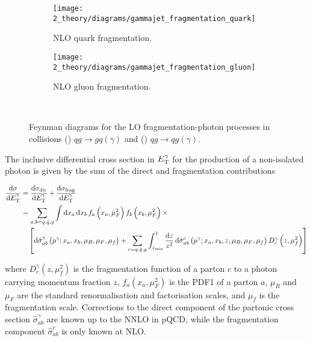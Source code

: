 \begin{figure}[ht!]
    \centering
    \begin{subfigure}[h]{0.49\linewidth}
        \centering
        \texttt{[image: 2\_theory/diagrams/gammajet\_fragmentation\_quark]}
        \caption{\ac{NLO} quark fragmentation.}
        \label{fig:theory:sm:prompt_photon:feynman_lo_frag:quark}
    \end{subfigure}
    \hfill
    \begin{subfigure}[h]{0.49\linewidth}
        \centering
        \texttt{[image: 2\_theory/diagrams/gammajet\_fragmentation\_gluon]}
        \caption{\ac{NLO} gluon fragmentation.}
        \label{fig:theory:sm:prompt_photon:feynman_lo_frag:gluon}
    \end{subfigure}\\
    \caption{Feynman diagrams for the \ac{LO} fragmentation-photon processes in \pp collisions () \(qg \to g q(\gamma)\) and () \(qg \to q g(\gamma)\).}
    \label{fig:theory:sm:prompt_photon:feynman_lo_frag}
\end{figure}


The inclusive differential cross section in \(E_{\text{T}}^{\gamma}\) for the production of a non-isolated photon is given by the sum of the direct and fragmentation contributions

\begin{align}
    \dv{\sigma}{\ensuremath{E_{\text{T}}^{\gamma}}} &= \dv{\sigma_{\text{dir}}}{\ensuremath{E_{\text{T}}^{\gamma}}} + \dv{\sigma_{\text{frag}}}{\ensuremath{E_{\text{T}}^{\gamma}}} \nonumber\\
    &= \sum_{a,b=q,\bar{q},g} \int \dd{x_a} \dd{x_b} f_a\left(x_a, \mu_F^2\right) f_b\left(x_b, \mu_F^2\right) \times \nonumber\\
    &\quad
    \left[
        \dd{\hat{\sigma}^{\gamma}_{ab} \left(p^{\gamma}; x_a, x_b, \mu_R, \mu_F, \mu_f\right)}
        +
        \sum_{c=q,\bar{q}, g} \int_{z_{\min}}^{1} \frac{\dd{z}}{z^2} \dd{\hat{\sigma}^c_{ab} \left(p^{\gamma}; x_a, x_b, z, \mu_R, \mu_F, \mu_f\right)} D_c^{\gamma} \left(z, \mu_f^2\right)
    \right]
\end{align}


where \(D_c^{\gamma} \left(z,\mu_f^2\right)\) is the fragmentation function of a parton \(c\) to a photon carrying momentum fraction \(z\), \(f_a \left(x_a, \mu^2_F \right)\) is the \ac{PDF1} of a parton \(a\), \(\mu_R\) and \(\mu_F\) are the standard renormalisation and factorisation scales, and \(\mu_f\) is the fragmentation scale. Corrections to the direct component of the partonic cross section \(\hat{\sigma}^{\gamma}_{ab}\) are known up to the \ac{NNLO} in \ac{pQCD}, while the fragmentation component \(\hat{\sigma}^c_{ab}\) is only known at \ac{NLO}.

